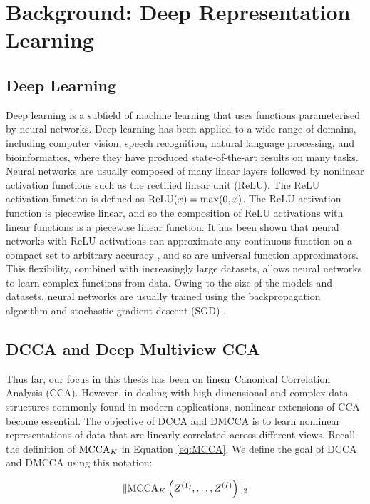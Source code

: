 \section{Background: Deep Representation Learning}

\subsection{Deep Learning}

Deep learning is a subfield of machine learning that uses functions parameterised by neural networks.
Deep learning has been applied to a wide range of domains, including computer vision, speech recognition, natural language processing, and bioinformatics, where they have produced state-of-the-art results on many tasks.
Neural networks are usually composed of many linear layers followed by nonlinear activation functions such as the rectified linear unit (ReLU).
The ReLU activation function is defined as $\operatorname{ReLU}(x) = \max(0, x)$.
The ReLU activation function is piecewise linear, and so the composition of ReLU activations with linear functions is a piecewise linear function.
It has been shown that neural networks with ReLU activations can approximate any continuous function on a compact set to arbitrary accuracy \citep{perekrestenko2018universal}, and so are universal function approximators.
This flexibility, combined with increasingly large datasets, allows neural networks to learn complex functions from data.
Owing to the size of the models and datasets, neural networks are usually trained using the backpropagation algorithm and stochastic gradient descent (SGD) \citep{amari1993backpropagation}.

\subsection{DCCA and Deep Multiview CCA}

Thus far, our focus in this thesis has been on linear Canonical Correlation Analysis (CCA). However, in dealing with high-dimensional and complex data structures commonly found in modern applications, nonlinear extensions of CCA become essential.
The objective of DCCA and DMCCA is to learn nonlinear representations of data that are linearly correlated across different views. Recall the definition of $\operatorname{MCCA}_K$ in Equation \eqref{eq:MCCA}. We define the goal of DCCA and DMCCA using this notation:

\begin{align}
\label{eq:DMCCA-def}
\lVert\operatorname{MCCA}_K\left(Z^{(1)}, \ldots, Z^{(I)}\right)\rVert_2
\end{align}

